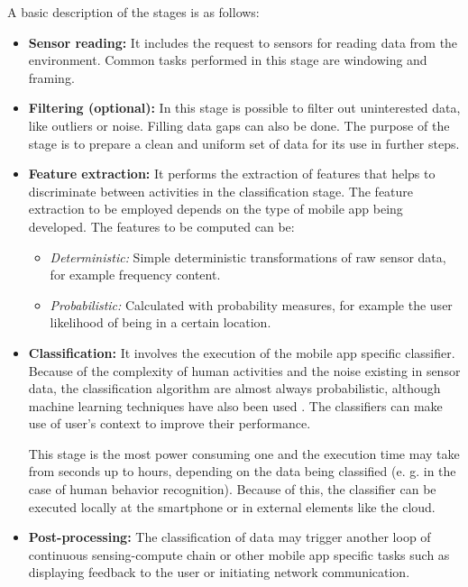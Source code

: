 A basic description of the stages is as follows:
\begin{itemize}
  \item \textbf{Sensor reading:} It includes the request to sensors for reading data from the environment. 
  Common tasks performed in this stage are windowing and framing.

  \item \textbf{Filtering (optional):} In this stage is possible to filter out uninterested data, like outliers or noise.
  Filling data gaps can also be done.
  The purpose of the stage is to prepare a clean and uniform set of data for its use in further steps.

  \item \textbf{Feature extraction:} It performs the extraction of features that helps to discriminate between activities in the classification stage.
  The feature extraction to be employed depends on the type of mobile app being developed.
  The features to be computed can be:
  \begin{itemize}
    \item \emph{Deterministic:} Simple deterministic transformations of raw sensor data, for example frequency content.
    \item \emph{Probabilistic:} Calculated with probability measures, for example the user likelihood of being in a certain location.
  \end{itemize}

  \item \textbf{Classification:} It involves the execution of the mobile app specific classifier.
  Because of the complexity of human activities and the noise existing in sensor data, the classification algorithm are almost always probabilistic, although machine learning techniques have also been used \cite{Choudhury2008}.
  The classifiers can make use of user’s context to improve their performance.

  This stage is the most power consuming one and the execution time may take from seconds up to hours, depending on the data being classified (e. g. in the case of human behavior recognition).
  Because of this, the classifier can be executed locally at the smartphone or in external elements like the cloud.

  \item \textbf{Post-processing:} The classification of data may trigger another loop of continuous sensing-compute chain or other mobile app specific tasks such as displaying feedback to the user or initiating network communication.

\end{itemize}

